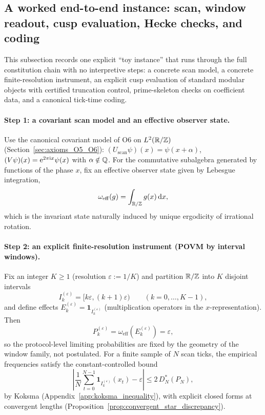 \subsection{A worked end-to-end instance: scan, window readout, cusp evaluation, Hecke checks, and coding}
\label{sec:worked_end_to_end_instance}

This subsection records one explicit ``toy instance'' that runs through the full constitution chain with no interpretive steps: a concrete scan model, a concrete finite-resolution instrument, an explicit cusp evaluation of standard modular objects with certified truncation control, prime-skeleton checks on coefficient data, and a canonical tick-time coding.

\paragraph{Step 1: a covariant scan model and an effective observer state.}
Use the canonical covariant model of O6 on $L^2(\mathbb{R}/\mathbb{Z})$ (Section~\ref{sec:axioms_O5_O6}): $(U_{\mathrm{scan}}\psi)(x)=\psi(x+\alpha)$, $(V\psi)(x)=\mathrm{e}^{2\pi\mathrm{i} x}\psi(x)$ with $\alpha\notin\mathbb{Q}$.
For the commutative subalgebra generated by functions of the phase $x$, fix an effective observer state given by Lebesgue integration,
\begin{equation}
\omega_{\mathrm{eff}}(g)=\int_{\mathbb{R}/\mathbb{Z}} g(x)\,\mathrm{d} x,
\end{equation}
which is the invariant state naturally induced by unique ergodicity of irrational rotation.

\paragraph{Step 2: an explicit finite-resolution instrument (POVM by interval windows).}
Fix an integer $K\ge 1$ (resolution $\varepsilon:=1/K$) and partition $\mathbb{R}/\mathbb{Z}$ into $K$ disjoint intervals
\begin{equation}
I_k^{(\varepsilon)}=[k\varepsilon,(k+1)\varepsilon)\qquad (k=0,\ldots,K-1),
\end{equation}
and define effects $E_k^{(\varepsilon)}=\mathbf{1}_{I_k^{(\varepsilon)}}$ (multiplication operators in the $x$-representation). Then
\begin{equation}
P_k^{(\varepsilon)}=\omega_{\mathrm{eff}}\!\left(E_k^{(\varepsilon)}\right)=\varepsilon,
\end{equation}
so the protocol-level limiting probabilities are fixed by the geometry of the window family, not postulated.
For a finite sample of $N$ scan ticks, the empirical frequencies satisfy the constant-controlled bound
\begin{equation}
\left|\frac{1}{N}\sum_{t=0}^{N-1}\mathbf{1}_{I_k^{(\varepsilon)}}(x_t)-\varepsilon\right|
\le 2\,D_N^\ast(P_N),
\end{equation}
by Koksma (Appendix~\ref{app:koksma_inequality}), with explicit closed forms at convergent lengths (Proposition~\ref{prop:convergent_star_discrepancy}).

